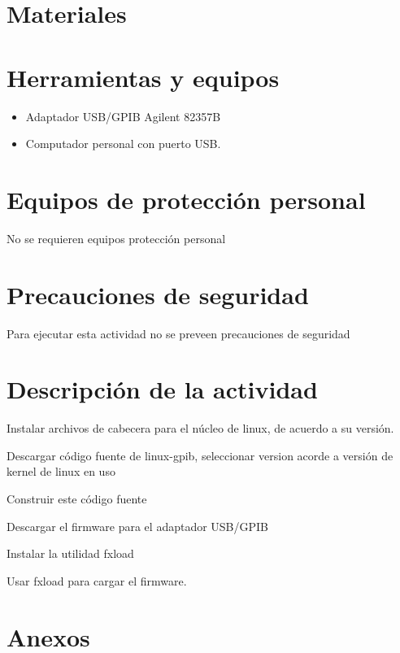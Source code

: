 \documentclass[paper=letter,oneside,fontsize=12pt]{article}
\begin{document}
	\section{Materiales}
		
		
	\section{Herramientas y equipos}
		
		\begin{itemize}
			\item Adaptador USB/GPIB Agilent 82357B
			\item Computador personal con puerto USB.
		\end{itemize}
	
	\section{Equipos de protección personal}
		No se requieren equipos protección personal
		
	\section{Precauciones de seguridad}
		Para ejecutar esta actividad no se preveen precauciones de seguridad
		
	\section{Descripción de la actividad}	
		
		Instalar archivos de cabecera para el núcleo de linux, de acuerdo a su versión.
		
		Descargar código fuente de linux-gpib, seleccionar version acorde a versión de kernel de linux en uso
		
		Construir este código fuente
		
		Descargar el firmware para el adaptador USB/GPIB
		
		Instalar la utilidad fxload
		
		Usar fxload para cargar el firmware.	
		
	
	\section{Anexos}	

	
\end{document}
